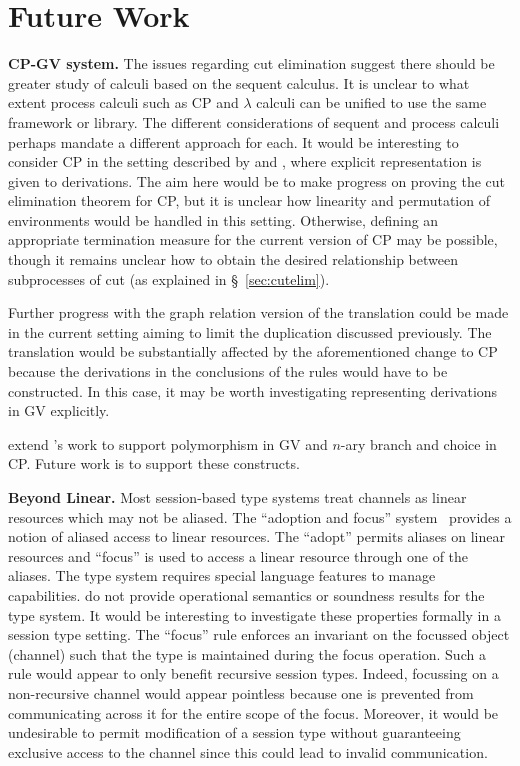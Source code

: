 \section{Future Work}

\textbf{CP-GV system.} The issues regarding cut elimination suggest there
should be greater study of calculi based on the sequent calculus. It is
unclear to what extent process calculi such as CP and $\lambda$ calculi can be
unified to use the same framework or library. The different considerations of
sequent and process calculi perhaps mandate a different approach for each. It
would be interesting to consider CP in the setting described by
\citeauthor{Tews:2013} and \citeauthor{Dawson:2010}, where explicit
representation is given to derivations. The aim here would be to make progress
on proving the cut elimination theorem for CP, but it is unclear how linearity
and permutation of environments would be handled in this setting. Otherwise,
defining an appropriate termination measure for the current version of CP may
be possible, though it remains unclear how to obtain the desired relationship
between subprocesses of cut (as explained in \S~\ref{sec:cutelim}).

Further progress with the graph relation version of the translation could be
made in the current setting aiming to limit the duplication discussed
previously. The translation would be substantially affected by the
aforementioned change to CP because the derivations in the conclusions of the
rules would have to be constructed. In this case, it may be worth
investigating representing derivations in GV explicitly.

\citeauthor{Lindley:2014:SAP} extend \citeauthor{Wadler:2014}'s work to
support polymorphism in GV and $n$-ary branch and choice in CP. Future work is
to support these constructs.

\textbf{Beyond Linear.} Most session-based type systems treat channels as
linear resources which may not be aliased. The ``adoption and focus''
system~\cite{Fahndrich:2002} provides a notion of aliased access to linear
resources. The ``adopt'' permits aliases on linear resources and ``focus'' is
used to access a linear resource through one of the aliases. The type system
requires special language features to manage
capabilities. \citeauthor{Fahndrich:2002} do not provide operational semantics
or soundness results for the type system. It would be interesting to
investigate these properties formally in a session type setting. The ``focus''
rule enforces an invariant on the focussed object (channel) such that the type
is maintained during the focus operation. Such a rule would appear to only
benefit recursive session types. Indeed, focussing on a non-recursive channel
would appear pointless because one is prevented from communicating across it
for the entire scope of the focus. Moreover, it would be undesirable to permit
modification of a session type without guaranteeing exclusive access to the
channel since this could lead to invalid communication.

